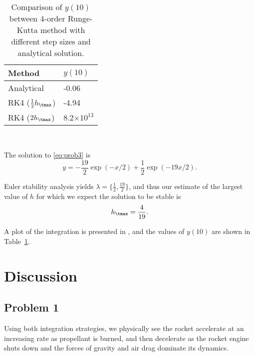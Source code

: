 \documentclass[12pt]{article}
\begin{document}
\begin{table}[t]
\centering
\begin{tabular}{ll}
\toprule
Method & $y(10)$ \\
\midrule
Analytical                  & -0.06 \\
RK4 ($\tfrac{1}{2}h_\tmax$) & -4.94 \\
RK4 ($2h_\tmax$)            & 8.2$\times10^{13}$ \\
\bottomrule
\end{tabular}
\\[6pt]
\caption{Comparison of $y(10)$ between 4\th-order Runge-Kutta method with different step sizes and analytical solution.}
\label{tbl:prob3}
\end{table}

The solution to \eqref{eq:prob3} is
\begin{equation}
y = -\frac{19}{2} \exp(-x/2) + \frac{1}{2} \exp(-19x/2)
.
\label{eq:prob3_analytic}
\end{equation}

Euler stability analysis yields $\lambda = \{ \tfrac{1}{2}, \tfrac{19}{2} \}$, and thus our estimate of the largest value of $h$ for which we expect the solution to be stable is
\begin{equation}
h_\tmax = \frac{4}{19}
.
\end{equation}

A plot of the integration is presented in , and the values of $y(10)$ are shown in Table~\ref{tbl:prob3}.

\section{Discussion} %

\subsection*{Problem 1}

Using both integration strategies, we physically see the rocket accelerate at an increasing rate as propellant is burned, and then decelerate as the rocket engine shuts down and the forces of gravity and air drag dominate its dynamics. 
\end{document}
